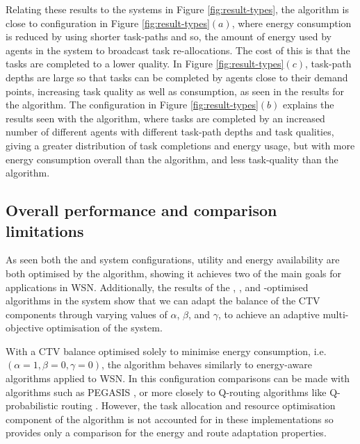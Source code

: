 Relating these results to the systems in Figure \ref{fig:result-types}, the \algorithmEnergy{}{} algorithm is close to configuration in Figure \ref{fig:result-types}$(a)$, where energy consumption is reduced by using shorter task-paths and so, the amount of energy used by agents in the system to broadcast task re-allocations. The cost of this is that the tasks are completed to a lower quality. In Figure \ref{fig:result-types}$(c)$, task-path depths are large so that tasks can be completed by agents close to their demand points, increasing task quality as well as consumption, as seen in the results for the \algorithmQuality{}{} algorithm. The configuration in Figure \ref{fig:result-types}$(b)$ explains the results seen with the \algorithmDistribution{}{} algorithm, where tasks are completed by an increased number of different agents with different task-path depths and task qualities, giving a greater distribution of task completions and energy usage, but with more energy consumption overall than the \algorithmEnergy{}{} algorithm, and less task-quality than the \algorithmQuality{}{} algorithm.

\subsection{Overall performance and comparison limitations}
As seen both the \simulationSimple{}{} and \simulationExtended{}{} system configurations, utility and energy availability are both optimised by the algorithm, showing it achieves two of the main goals for applications in WSN. Additionally, the results of the \algorithmEnergy{}{}, \algorithmQuality{}{}, and \algorithmDistribution{}{}-optimised algorithms in the \simulationExtended{}{} system show that we can adapt the balance of the CTV components through varying values of $\alpha$, $\beta$, and $\gamma$, to achieve an adaptive multi-objective optimisation of the system.

With a CTV balance optimised solely to minimise energy consumption, i.e. $(\alpha=1,\beta=0,\gamma=0)$, the \acronymWSNOptimisation{}{} algorithm behaves similarly to energy-aware algorithms applied to WSN. In this configuration comparisons can be made with algorithms such as PEGASIS \citep{Lindsey2002}, or more closely to Q-routing algorithms like Q-probabilistic routing \citep{Arroyo-Valles2007}. However, the task allocation and resource optimisation component of the \acronymWSNOptimisation{}{} algorithm is not accounted for in these implementations so provides only a comparison for the energy and route adaptation properties. 

